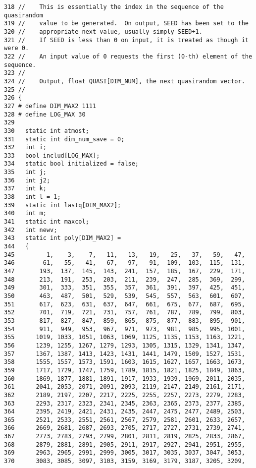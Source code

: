 \begin{Code}
\begin{verbatim}
318 //    This is essentially the index in the sequence of the quasirandom
319 //    value to be generated.  On output, SEED has been set to the
320 //    appropriate next value, usually simply SEED+1.
321 //    If SEED is less than 0 on input, it is treated as though it were 0.
322 //    An input value of 0 requests the first (0-th) element of the sequence.
323 //
324 //    Output, float QUASI[DIM_NUM], the next quasirandom vector.
325 //
326 {
327 # define DIM_MAX2 1111
328 # define LOG_MAX 30
329 
330   static int atmost;
331   static int dim_num_save = 0;
332   int i;
333   bool includ[LOG_MAX];
334   static bool initialized = false;
335   int j;
336   int j2;
337   int k;
338   int l = 1;
339   static int lastq[DIM_MAX2];
340   int m;
341   static int maxcol;
342   int newv;
343   static int poly[DIM_MAX2] =
344   {
345         1,    3,    7,   11,   13,   19,   25,   37,   59,   47,
346        61,   55,   41,   67,   97,   91,  109,  103,  115,  131,
347       193,  137,  145,  143,  241,  157,  185,  167,  229,  171,
348       213,  191,  253,  203,  211,  239,  247,  285,  369,  299,
349       301,  333,  351,  355,  357,  361,  391,  397,  425,  451,
350       463,  487,  501,  529,  539,  545,  557,  563,  601,  607,
351       617,  623,  631,  637,  647,  661,  675,  677,  687,  695, 
352       701,  719,  721,  731,  757,  761,  787,  789,  799,  803,
353       817,  827,  847,  859,  865,  875,  877,  883,  895,  901,
354       911,  949,  953,  967,  971,  973,  981,  985,  995, 1001,
355      1019, 1033, 1051, 1063, 1069, 1125, 1135, 1153, 1163, 1221,
356      1239, 1255, 1267, 1279, 1293, 1305, 1315, 1329, 1341, 1347,
357      1367, 1387, 1413, 1423, 1431, 1441, 1479, 1509, 1527, 1531,
358      1555, 1557, 1573, 1591, 1603, 1615, 1627, 1657, 1663, 1673, 
359      1717, 1729, 1747, 1759, 1789, 1815, 1821, 1825, 1849, 1863,
360      1869, 1877, 1881, 1891, 1917, 1933, 1939, 1969, 2011, 2035,
361      2041, 2053, 2071, 2091, 2093, 2119, 2147, 2149, 2161, 2171,
362      2189, 2197, 2207, 2217, 2225, 2255, 2257, 2273, 2279, 2283,
363      2293, 2317, 2323, 2341, 2345, 2363, 2365, 2373, 2377, 2385,
364      2395, 2419, 2421, 2431, 2435, 2447, 2475, 2477, 2489, 2503, 
365      2521, 2533, 2551, 2561, 2567, 2579, 2581, 2601, 2633, 2657,
366      2669, 2681, 2687, 2693, 2705, 2717, 2727, 2731, 2739, 2741,
367      2773, 2783, 2793, 2799, 2801, 2811, 2819, 2825, 2833, 2867,
368      2879, 2881, 2891, 2905, 2911, 2917, 2927, 2941, 2951, 2955,
369      2963, 2965, 2991, 2999, 3005, 3017, 3035, 3037, 3047, 3053,
370      3083, 3085, 3097, 3103, 3159, 3169, 3179, 3187, 3205, 3209,

\end{verbatim}
\end{Code}
